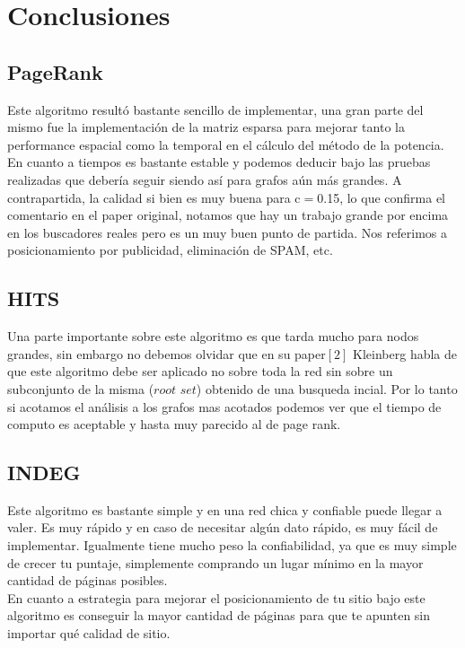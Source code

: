 
\section{Conclusiones}

\subsection{PageRank}
Este algoritmo resultó bastante sencillo de implementar, una gran parte del mismo fue la implementación de la matriz esparsa para mejorar tanto la performance espacial como la temporal en el cálculo del método de la potencia. \\
En cuanto a tiempos es bastante estable y podemos deducir bajo las pruebas realizadas que debería seguir siendo así para grafos aún más grandes. A contrapartida, la calidad si bien es muy buena para c$=$0.15, lo que confirma el comentario en el paper original, notamos que hay un trabajo grande por encima en los buscadores reales pero es un muy buen punto de partida. Nos referimos a posicionamiento por publicidad, eliminación de SPAM, etc.

\subsection{HITS}

Una parte importante sobre este algoritmo es que tarda mucho para nodos grandes, sin embargo no debemos olvidar que en su paper$[2]$ Kleinberg habla de que este algoritmo debe ser aplicado no sobre toda la red sin sobre un subconjunto de la misma ($\textit{root set}$) obtenido de una busqueda incial. Por lo tanto si acotamos el análisis a los grafos mas acotados podemos ver que el tiempo de computo es aceptable y hasta muy parecido al de page rank. 

\subsection{INDEG}
Este algoritmo es bastante simple y en una red chica y confiable puede llegar a valer. Es muy rápido y en caso de necesitar algún dato rápido, es muy fácil de implementar. Igualmente tiene mucho peso la confiabilidad, ya que es muy simple de crecer tu puntaje, simplemente comprando un lugar mínimo en la mayor cantidad de páginas posibles.\\
En cuanto a estrategia para mejorar el posicionamiento de tu sitio bajo este algoritmo es conseguir la mayor cantidad de páginas para que te apunten sin importar qué calidad de sitio.

